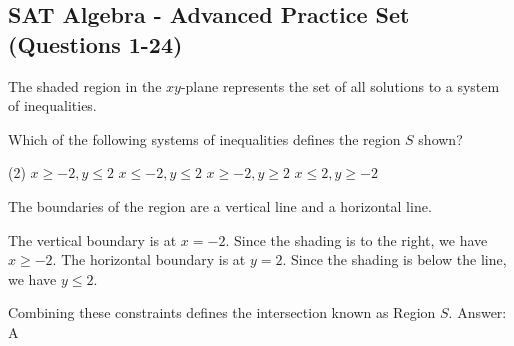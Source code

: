 \documentclass[11pt,paper=a4,answers]{exam}
\begin{document}
\begin{questions}
\pointsinrightmargin
\pointsdroppedatright
\marksnotpoints
{}
\pointformat{\boldmath\themarginpoints}
\bracketedpoints


\section*{SAT Algebra - Advanced Practice Set (Questions 1-24)}

\question
The shaded region in the $xy$-plane represents the set of all solutions to a system of inequalities.
\begin{center}
\end{center}
Which of the following systems of inequalities defines the region $S$ shown?
\begin{tasks}(2)
\task $x \geq -2, y \leq 2$
\task $x \leq -2, y \leq 2$
\task $x \geq -2, y \geq 2$
\task $x \leq 2, y \geq -2$
\end{tasks}

\begin{solution}
The boundaries of the region are a vertical line and a horizontal line.
\vspace{5pt}
\begin{center}
The vertical boundary is at $x = -2$. Since the shading is to the right, we have $x \geq -2$.
\vspace{5pt}
The horizontal boundary is at $y = 2$. Since the shading is below the line, we have $y \leq 2$.
\end{center}
\vspace{5pt}
Combining these constraints defines the intersection known as Region $S$.
\vspace{5pt}
Answer: \colorbox{yellow!100}{A}
\end{solution}


\end{questions}
\end{document}
